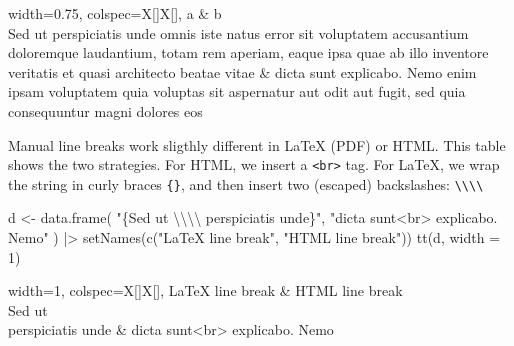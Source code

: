 \documentclass[
  letterpaper,
  DIV=11,
  numbers=noendperiod]{scrartcl}
\newenvironment{Shaded}{\begin{snugshade}}{\end{snugshade}}
\newcommand{\AttributeTok}[1]{\textcolor[rgb]{0.40,0.45,0.13}{#1}}
\newcommand{\DecValTok}[1]{\textcolor[rgb]{0.68,0.00,0.00}{#1}}
\newcommand{\FunctionTok}[1]{\textcolor[rgb]{0.28,0.35,0.67}{#1}}
\newcommand{\NormalTok}[1]{\textcolor[rgb]{0.00,0.23,0.31}{#1}}
\newcommand{\OtherTok}[1]{\textcolor[rgb]{0.00,0.23,0.31}{#1}}
\newcommand{\SpecialCharTok}[1]{\textcolor[rgb]{0.37,0.37,0.37}{#1}}
\newcommand{\StringTok}[1]{\textcolor[rgb]{0.13,0.47,0.30}{#1}}
\begin{document}
\begin{table}[H]

\centering
\begin{tblr}[         %
]                     %
{                     %
width={0.75\linewidth},
colspec={X[]X[]},
}                     %
\toprule
a & b \\ \midrule %
Sed ut perspiciatis unde omnis iste natus error sit voluptatem accusantium doloremque laudantium, totam rem aperiam, eaque ipsa quae ab illo inventore veritatis et quasi architecto beatae vitae & dicta sunt explicabo. Nemo enim ipsam voluptatem quia voluptas sit aspernatur aut odit aut fugit, sed quia consequuntur magni dolores eos \\
\bottomrule
\end{tblr}
\end{table}

Manual line breaks work sligthly different in LaTeX (PDF) or HTML. This
table shows the two strategies. For HTML, we insert a
\texttt{\textless{}br\textgreater{}} tag. For LaTeX, we wrap the string
in curly braces \texttt{\{\}}, and then insert two (escaped)
backslashes:
\texttt{\textbackslash{}\textbackslash{}\textbackslash{}\textbackslash{}}

\begin{Shaded}
\begin{Highlighting}[]
\NormalTok{d }\OtherTok{\textless{}{-}} \FunctionTok{data.frame}\NormalTok{(}
  \StringTok{"\{Sed ut }\SpecialCharTok{\textbackslash{}\textbackslash{}\textbackslash{}\textbackslash{}}\StringTok{ perspiciatis unde\}"}\NormalTok{,}
  \StringTok{"dicta sunt\textless{}br\textgreater{} explicabo. Nemo"}
\NormalTok{) }\SpecialCharTok{|\textgreater{}} \FunctionTok{setNames}\NormalTok{(}\FunctionTok{c}\NormalTok{(}\StringTok{"LaTeX line break"}\NormalTok{, }\StringTok{"HTML line break"}\NormalTok{))}
\FunctionTok{tt}\NormalTok{(d, }\AttributeTok{width =} \DecValTok{1}\NormalTok{)}
\end{Highlighting}
\end{Shaded}

\begin{table}[H]

\centering
\begin{tblr}[         %
]                     %
{                     %
width={1\linewidth},
colspec={X[]X[]},
}                     %
\toprule
LaTeX line break & HTML line break \\ \midrule %
{Sed ut \\ perspiciatis unde} & dicta sunt<br> explicabo. Nemo \\
\bottomrule
\end{tblr}
\end{table}
\end{document}
